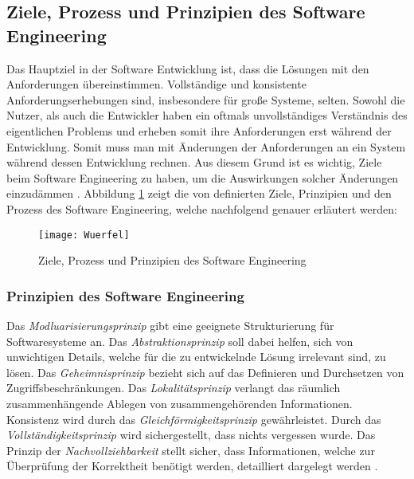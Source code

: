 \subsection{Ziele, Prozess und Prinzipien des Software Engineering}

Das Hauptziel in der Software Entwicklung ist, dass die Lösungen mit den Anforderungen übereinstimmen. Vollständige und konsistente Anforderungserhebungen sind, insbesondere für große Systeme, selten. Sowohl die Nutzer, als auch die Entwickler haben ein oftmals unvollständiges Verständnis des eigentlichen Problems und erheben somit ihre Anforderungen erst während der Entwicklung. Somit muss man mit Änderungen der Anforderungen an ein System während dessen Entwicklung rechnen. Aus diesem Grund ist es wichtig, Ziele beim Software Engineering zu haben, um die Auswirkungen solcher Änderungen einzudämmen \cite{Booch1993}.
Abbildung  \ref{fig:Wuerfel} zeigt die von \cite{ross1975software} definierten Ziele, Prinzipien und den Prozess des Software Engineering, welche nachfolgend genauer erläutert werden: 

\begin{figure}[htp]
\begin{center}
  \texttt{[image: Wuerfel]} %
  \caption{Ziele, Prozess und Prinzipien des Software Engineering  \cite{ross1975software}}
  \label{fig:Wuerfel}
\end{center}
\end{figure}

\subsubsection{Prinzipien des Software Engineering}


 Das \textit{Modluarisierungsprinzip} gibt eine geeignete Strukturierung für Softwaresysteme an. Das \textit{Abstraktionsprinzip} soll dabei helfen, sich von unwichtigen Details, welche für die zu entwickelnde Lösung irrelevant sind, zu lösen. Das \textit{Geheimnisprinzip} bezieht sich auf das Definieren und Durchsetzen von Zugriffsbeschränkungen. Das \textit{Lokalitätsprinzip} verlangt das räumlich zusammenhängende Ablegen von zusammengehörenden Informationen. Konsistenz wird durch das \textit{Gleichförmigkeitsprinzip} gewährleistet. Durch das \textit{Vollständigkeitsprinzip} wird sichergestellt, dass nichts vergessen wurde. Das Prinzip der \textit{Nachvollziehbarkeit} stellt sicher, dass Informationen, welche zur Überprüfung der Korrektheit benötigt werden, detailliert dargelegt werden \cite{ross1975software}.
 
